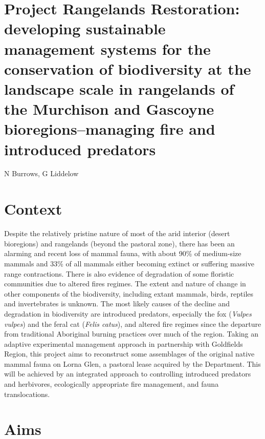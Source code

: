 \documentclass[version=last,
    paper=a4, %
    10pt, %
    usenames,
    dvipsnames,
    oneside, %
    headings=openany, %
    DIV=15 %
]{scrbook}
\begin{document}
\section*{Project Rangelands Restoration: developing sustainable management
systems for the conservation of biodiversity at the landscape scale in
rangelands of the Murchison and Gascoyne bioregions--managing fire and
introduced predators
}

N Burrows, G Liddelow



\section*{Context}

Despite the relatively pristine nature of most of the arid interior
(desert bioregions) and rangelands (beyond the pastoral zone), there has
been an alarming and recent loss of mammal fauna, with about 90\% of
medium-size mammals and 33\% of all mammals either becoming extinct or
suffering massive range contractions. There is also evidence of
degradation of some floristic communities due to altered fires regimes.
The extent and nature of change in other components of the biodiversity,
including extant mammals, birds, reptiles and invertebrates is unknown.
The most likely causes of the decline and degradation in biodiversity
are introduced predators, especially the fox (\emph{Vulpes vulpes}) and
the feral cat (\emph{Felis catus}), and altered fire regimes since the
departure from traditional Aboriginal burning practices over much of the
region. Taking an adaptive experimental management approach in
partnership with Goldfields Region, this project aims to reconstruct
some assemblages of the original native mammal fauna on Lorna Glen, a
pastoral lease acquired by the Department. This will be achieved by an
integrated approach to controlling introduced predators and herbivores,
ecologically appropriate fire management, and fauna translocations.




\section*{Aims}
\end{document}
